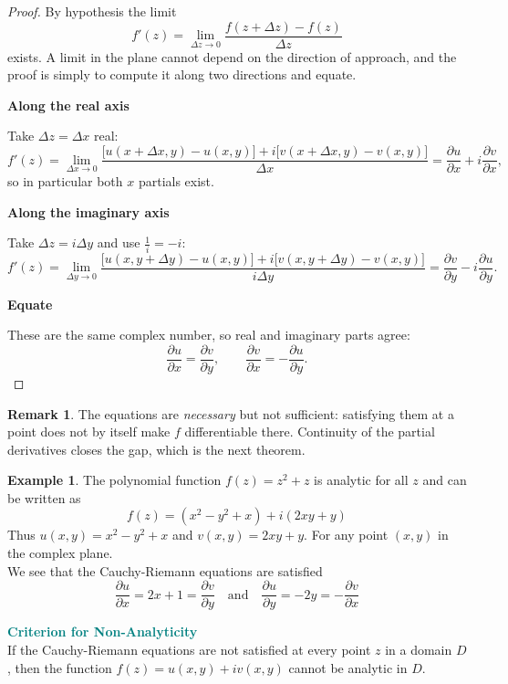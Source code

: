 \documentclass[11pt,a4paper]{article}
\theoremstyle{definition}
\newtheorem{example}[thm]{Example}
\newtheorem{remark}[thm]{Remark}
\newcommand{\subhead}[1]{%
  \par\medskip\noindent\textbf{#1}\par\nobreak\smallskip}
\begin{document}
\begin{proof}
By hypothesis the limit
$$f'(z)=\lim_{\Delta z\rightarrow 0}\frac{f(z+\Delta z)-f(z)}{\Delta z}$$
exists. A limit in the plane cannot depend on the direction of approach, and
the proof is simply to compute it along two directions and equate.

\subhead{Along the real axis}
Take $\Delta z=\Delta x$ real:
$$f'(z)=\lim_{\Delta x\rightarrow 0}
\frac{\big[u(x+\Delta x,y)-u(x,y)\big]+i\big[v(x+\Delta x,y)-v(x,y)\big]}{\Delta x}
=\frac{\partial u}{\partial x}+i\frac{\partial v}{\partial x},$$
so in particular both $x$ partials exist.

\subhead{Along the imaginary axis}
Take $\Delta z=i\Delta y$ and use $\frac{1}{i}=-i$:
$$f'(z)=\lim_{\Delta y\rightarrow 0}
\frac{\big[u(x,y+\Delta y)-u(x,y)\big]+i\big[v(x,y+\Delta y)-v(x,y)\big]}{i\Delta y}
=\frac{\partial v}{\partial y}-i\frac{\partial u}{\partial y}.$$

\subhead{Equate}
These are the same complex number, so real and imaginary parts agree:
$$\frac{\partial u}{\partial x}=\frac{\partial v}{\partial y},\qquad
\frac{\partial v}{\partial x}=-\frac{\partial u}{\partial y}.$$
\end{proof}

\begin{remark}
The equations are \emph{necessary} but not sufficient: satisfying them at a
point does not by itself make $f$ differentiable there. Continuity of the
partial derivatives closes the gap, which is the next theorem.
\end{remark}

\begin{example}
The polynomial function $f(z) = z^2 + z$ is analytic for all $z$ and can be written as $$f(z) = (x^2 - y^2 + x ) + i(2xy + y)$$
Thus $u(x,y) = x^2 - y^2 + x$ and $v(x,y) = 2xy + y$. For any point $(x,y)$ in the complex plane.\\ We see that the Cauchy-Riemann equations are satisfied $$\frac{\partial u}{\partial x} = 2x + 1 = \frac{\partial v}{\partial y}\quad  \text{and}\quad  \frac{\partial u}{\partial y} = -2y = - \frac{\partial v}{\partial x}$$
\end{example}

\textbf{\textcolor{teal}{Criterion for Non-Analyticity}}\\
If the Cauchy-Riemann equations are not satisfied at every point $z$ in a domain $D$, then the function $f(z) = u(x,y) + iv(x,y)$ cannot be analytic in $D$.\\
\end{document}
